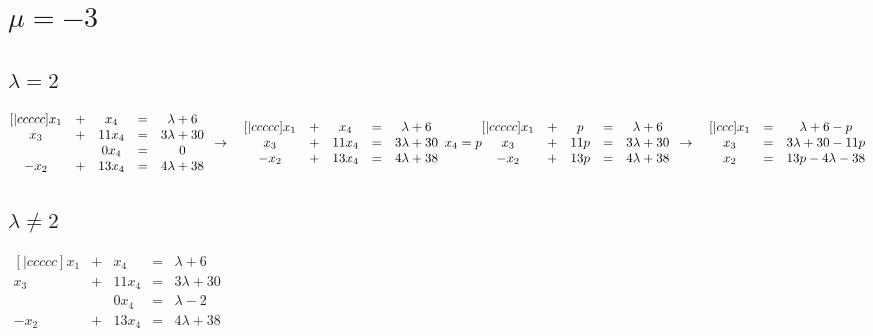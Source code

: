 \documentclass{article}
\begin{document}
    \section{\(\mu = -3\)}
    \subsection{\(\lambda = 2\)}
    \begin{math}
        \begin{matrix}[|ccccc]
            x_1 & + & x_4 & = & \lambda + 6\\
            x_3 & + & 11x_4 & = & 3\lambda + 30\\
            ~ & ~ & 0x_4 & = & 0\\
            -x_2 & + & 13x_4 & = & 4\lambda + 38
        \end{matrix}\\
        \\
        \to\quad
        \begin{matrix}[|ccccc]
            x_1 & + & x_4 & = & \lambda + 6\\
            x_3 & + & 11x_4 & = & 3\lambda + 30\\
            -x_2 & + & 13x_4 & = & 4\lambda + 38
        \end{matrix}\\
        \\
        x_4 = p\\
        \\
        \begin{matrix}[|ccccc]
            x_1 & + & p & = & \lambda + 6\\
            x_3 & + & 11p & = & 3\lambda + 30\\
            -x_2 & + & 13p & = & 4\lambda + 38
        \end{matrix}\\
        \\
        \to\quad
        \begin{matrix}[|ccc]
            x_1 & = & \lambda + 6 - p\\
            x_3 & = & 3\lambda + 30 - 11p\\
            x_2 & = & 13p - 4\lambda - 38
        \end{matrix}
    \end{math}
    \subsection{\(\lambda \neq 2\)}
    \begin{math}
        \begin{matrix}[|ccccc]
            x_1 & + & x_4 & = & \lambda + 6\\
            x_3 & + & 11x_4 & = & 3\lambda + 30\\
            ~ & ~ & 0x_4 & = & \lambda - 2\\
            -x_2 & + & 13x_4 & = & 4\lambda + 38
        \end{matrix}
    \end{math}
\end{document}
